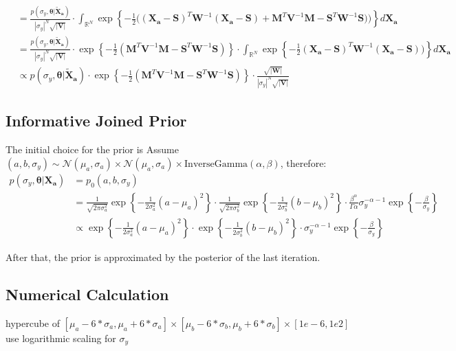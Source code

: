 \documentclass[10pt]{article}
\renewcommand{\vec}[1]{\boldsymbol{#1}}
\newcommand{\mat}[1]{\boldsymbol{#1}}
\begin{document}
{\begin{align}
    &= \frac{p(\sigma_y, \vec{\theta} | \vec{\tilde{X}_a})}{|\sigma_y|^N \sqrt{|\mat{V}|}} \cdot 
    \int_{\mathbb{R}^N} 
        \exp\left\{ - \frac{1}{2} \bigg( (\vec{X_a} - \vec{S})^T \mat{W}^{-1} (\mat{X_a} - \vec{S}) + \vec{M}^T \mat{V}^{-1} \vec{M} - \vec{S}^T \mat{W}^{-1} \vec{S}) \bigg) \right\} d\vec{X_a} \\
    
    &= \frac{p(\sigma_y, \vec{\theta} | \vec{\tilde{X}_a})}{|\sigma_y|^N \sqrt{|\mat{V}|}} \cdot 
    \exp\left\{ - \frac{1}{2} ( \vec{M}^T \mat{V}^{-1} \vec{M} - \vec{S}^T \mat{W}^{-1} \vec{S}) \right\} \cdot
    \int_{\mathbb{R}^N} 
        \exp\left\{ - \frac{1}{2} (\vec{X_a} - \vec{S})^T \mat{W}^{-1} (\mat{X_a} - \vec{S}) ) \right\} d\vec{X_a} \\
    
    &\propto p(\sigma_y, \vec{\theta} | \vec{\tilde{X}_a}) \cdot 
    \exp\left\{ - \frac{1}{2} ( \vec{M}^T \mat{V}^{-1} \vec{M} - \vec{S}^T \mat{W}^{-1} \vec{S}) \right\} \cdot
    \frac{\sqrt{|\mat{W}|}}{|\sigma_y|^N \sqrt{|\mat{V}|}}
\end{align}
}

\subsection{Informative Joined Prior}
The initial choice for the prior is
\label{sec:initial_informative_prior}
Assume $(a,b,\sigma_y) \sim \mathcal{N}(\mu_a, \sigma_a) \times \mathcal{N}(\mu_a, \sigma_a) \times \text{InverseGamma}(\alpha, \beta) $, therefore:
\begin{align}
    p(\sigma_y, \vec{\theta} | \vec{X_a}) &= p_0(a, b, \sigma_y) \\
    &= 
    \frac{1}{\sqrt{2 \pi \sigma_{a}^2}} \exp\left\{ - \frac{1}{2\sigma_{a}^2} ( a - \mu_{a} )^2 \right\} \cdot 
    \frac{1}{\sqrt{2 \pi \sigma_{b}^2}} \exp\left\{ - \frac{1}{2\sigma_{b}^2} ( b - \mu_{b} )^2 \right\} \cdot
    \frac{\beta^{\alpha}}{\Gamma{\alpha}} \sigma_y^{-\alpha-1} \exp\left\{ - \frac{\beta}{\sigma_y} \right\} \\
    &\propto 
    \exp\left\{ - \frac{1}{2\sigma_{a}^2} ( a - \mu_{a} )^2 \right\} \cdot 
    \exp\left\{ - \frac{1}{2\sigma_{b}^2} ( b - \mu_{b} )^2 \right\} \cdot
    \sigma_y^{-\alpha-1} \exp\left\{ - \frac{\beta}{\sigma_y} \right\} 
\end{align}

After that, the prior is approximated by the posterior of the last iteration.

\subsection{Numerical Calculation}
hypercube of $[\mu_a - 6 * \sigma_a, \mu_a + 6 * \sigma_a] \times [\mu_b - 6 * \sigma_b, \mu_b + 6 * \sigma_b] \times [1e-6, 1e2]$
use logarithmic scaling for $\sigma_y$
\end{document}
